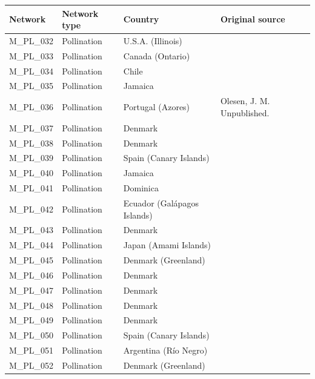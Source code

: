 \documentclass[12pt]{article}
\begin{document}
\begin{spacing}{1.5}
    \begin{table}[h!]
    \begin{center}
    \begin{tabular}{|l l l m{6cm} |}
    \hline
    Network & Network type & Country & Original source \\
    \hline
    M\_PL\_032  & Pollination & U.S.A. (Illinois) & \citep{Schemske1978}  \\
    M\_PL\_033  & Pollination & Canada (Ontario) & \citep{Small1976} \\
    M\_PL\_034  & Pollination & Chile & \citep{SmithRamirez2005}  \\
    M\_PL\_035  & Pollination & Jamaica & \citep{Percival1974}  \\
    M\_PL\_036  & Pollination & Portugal (Azores) & Olesen, J. M. Unpublished.  \\
    M\_PL\_037  & Pollination & Denmark & \citep{Montero2005} \\
    M\_PL\_038  & Pollination & Denmark & \citep{Montero2005} \\
    M\_PL\_039  & Pollination & Spain (Canary Islands) & \citep{Stald2003} \\
    M\_PL\_040  & Pollination & Jamaica & \citep{Ingversen2006} \\
    M\_PL\_041  & Pollination & Dominica & \citep{Ingversen2006} \\
    M\_PL\_042  & Pollination & Ecuador (Gal\'{a}pagos Islands) & \citep{Philipp2006} \\
    M\_PL\_043  & Pollination & Denmark & \citep{Montero2005} \\
    M\_PL\_044  & Pollination & Japan (Amami Islands) & \citep{Kato2000}  \\
    M\_PL\_045  & Pollination & Denmark (Greenland) & \citep{Lundgren2005}  \\
    M\_PL\_046  & Pollination & Denmark & \citep{Bundgaard2003} \\
    M\_PL\_047  & Pollination & Denmark & \citep{Dupont2009a}  \\
    M\_PL\_048  & Pollination & Denmark & \citep{Dupont2009a}  \\
    M\_PL\_049  & Pollination & Denmark & \citep{Bek2006}  \\
    M\_PL\_050  & Pollination & Spain (Canary Islands) & \citep{Stald2003} \\
    M\_PL\_051  & Pollination & Argentina (R\'{i}o Negro) & \citep{Vazquez2002} \\
    M\_PL\_052  & Pollination & Denmark (Greenland) & \citep{Witt1998}  \\

\end{tabular}
\end{center}
\end{table}
\end{spacing}
\end{document}
